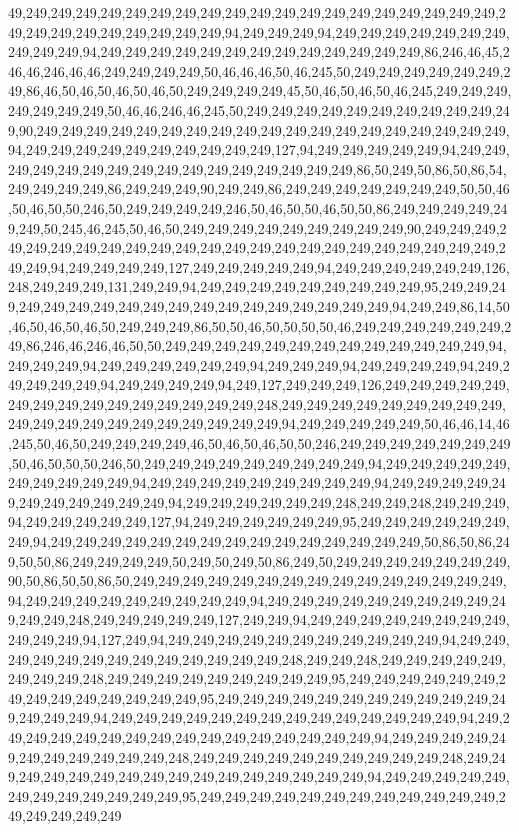 49,249,249,249,249,249,249,249,249,249,249,249,249,249,249,249,249,249,249,249,249,249,249,249,249,249,249,249,249,94,249,249,249,94,249,249,249,249,249,249,249,249,249,249,94,249,249,249,249,249,249,249,249,249,249,249,249,249,86,246,46,45,246,46,246,46,46,249,249,249,249,50,46,46,46,50,46,245,50,249,249,249,249,249,249,249,86,46,50,46,50,46,50,46,50,249,249,249,249,45,50,46,50,46,50,46,245,249,249,249,249,249,249,249,50,46,46,246,46,245,50,249,249,249,249,249,249,249,249,249,249,249,90,249,249,249,249,249,249,249,249,249,249,249,249,249,249,249,249,249,249,249,94,249,249,249,249,249,249,249,249,249,249,127,94,249,249,249,249,249,94,249,249,249,249,249,249,249,249,249,249,249,249,249,249,249,249,86,50,249,50,86,50,86,54,249,249,249,249,86,249,249,249,90,249,249,86,249,249,249,249,249,249,249,50,50,46,50,46,50,50,246,50,249,249,249,249,246,50,46,50,50,46,50,50,86,249,249,249,249,249,249,50,245,46,245,50,46,50,249,249,249,249,249,249,249,249,249,90,249,249,249,249,249,249,249,249,249,249,249,249,249,249,249,249,249,249,249,249,249,249,249,249,249,94,249,249,249,249,127,249,249,249,249,249,94,249,249,249,249,249,249,126,248,249,249,249,131,249,249,94,249,249,249,249,249,249,249,249,249,95,249,249,249,249,249,249,249,249,249,249,249,249,249,249,249,249,249,249,94,249,249,86,14,50,46,50,46,50,46,50,249,249,249,86,50,50,46,50,50,50,50,46,249,249,249,249,249,249,249,86,246,46,246,46,50,50,249,249,249,249,249,249,249,249,249,249,249,249,249,94,249,249,249,94,249,249,249,249,249,249,94,249,249,249,94,249,249,249,249,94,249,249,249,249,249,94,249,249,249,249,94,249,127,249,249,249,126,249,249,249,249,249,249,249,249,249,249,249,249,249,249,249,248,249,249,249,249,249,249,249,249,249,249,249,249,249,249,249,249,249,249,249,249,94,249,249,249,249,249,50,46,46,14,46,245,50,46,50,249,249,249,249,46,50,46,50,46,50,50,246,249,249,249,249,249,249,249,50,46,50,50,50,246,50,249,249,249,249,249,249,249,249,249,94,249,249,249,249,249,249,249,249,249,249,94,249,249,249,249,249,249,249,249,249,94,249,249,249,249,249,249,249,249,249,249,249,94,249,249,249,249,249,249,248,249,249,248,249,249,249,94,249,249,249,249,249,127,94,249,249,249,249,249,249,95,249,249,249,249,249,249,249,94,249,249,249,249,249,249,249,249,249,249,249,249,249,249,249,50,86,50,86,249,50,50,86,249,249,249,249,50,249,50,249,50,86,249,50,249,249,249,249,249,249,249,90,50,86,50,50,86,50,249,249,249,249,249,249,249,249,249,249,249,249,249,249,249,94,249,249,249,249,249,249,249,249,249,94,249,249,249,249,249,249,249,249,249,249,249,249,248,249,249,249,249,249,127,249,249,94,249,249,249,249,249,249,249,249,249,249,249,94,127,249,94,249,249,249,249,249,249,249,249,249,249,249,94,249,249,249,249,249,249,249,249,249,249,249,249,249,248,249,249,248,249,249,249,249,249,249,249,249,248,249,249,249,249,249,249,249,249,249,95,249,249,249,249,249,249,249,249,249,249,249,249,249,249,95,249,249,249,249,249,249,249,249,249,249,249,249,249,249,249,94,249,249,249,249,249,249,249,249,249,249,249,249,249,249,94,249,249,249,249,249,249,249,249,249,249,249,249,249,249,249,249,94,249,249,249,249,249,249,249,249,249,249,249,248,249,249,249,249,249,249,249,249,249,249,248,249,249,249,249,249,249,249,249,249,249,249,249,249,249,249,249,94,249,249,249,249,249,249,249,249,249,249,249,249,95,249,249,249,249,249,249,249,249,249,249,249,249,249,249,249,249,249